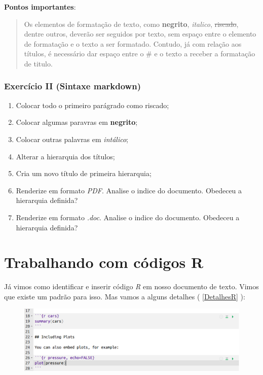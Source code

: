 \documentclass[]{book}
\providecommand{\tightlist}{%
  \setlength{\itemsep}{0pt}\setlength{\parskip}{0pt}}
\begin{document}
\textbf{Pontos importantes}:

\begin{quote}
Os elementos de formatação de texto, como \textbf{negrito}, \emph{italico}, \sout{riscado}, dentre outros, deverão ser seguidos por texto, sem espaço entre o elemento de formatação e o texto a ser formatado. Contudo, já com relação aos títulos, é necessário dar espaço entre o \# e o texto a receber a formatação de titulo.
\end{quote}

\hypertarget{exercuxedcio-ii-sintaxe-markdown}{%
\subsection{Exercício II (Sintaxe markdown)}\label{exercuxedcio-ii-sintaxe-markdown}}

\begin{enumerate}
\def\labelenumi{\arabic{enumi}.}
\tightlist
\item
  Colocar todo o primeiro parágrado como riscado;
\item
  Colocar algumas paravras em \textbf{negrito};\\
\item
  Colocar outras palavras em \emph{intálico};\\
\item
  Alterar a hierarquia dos títulos;\\
\item
  Cria um novo título de primeira hierarquia;\\
\item
  Renderize em formato \emph{PDF}. Analise o indice do documento. Obedeceu a hierarquia definida?\\
\item
  Renderize em formato \emph{.doc}. Analise o indice do documento. Obedeceu a hierarquia definida?
\end{enumerate}

\hypertarget{TrechoR}{%
\chapter{Trabalhando com códigos R}\label{TrechoR}}

Já vimos como identificar e inserir código \emph{R} em nosso documento de texto. Vimos que existe um padrão para isso. Mas vamos a alguns detalhes ( \autoref{DetalhesR} ):

\begin{figure}
\centering
\includegraphics{./img/DetalhesCodigoR.png}
\caption{\label{DetalhesR}}
\end{figure}
\end{document}
